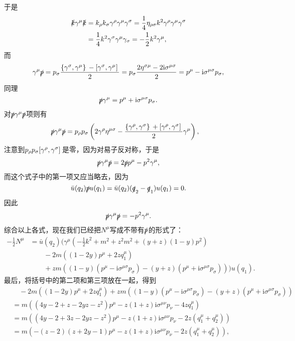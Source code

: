 \documentclass[hyperref, UTF8, a4paper]{ctexart}
\newcommand*{\ii}{\mathrm{i}}
\begin{document}
于是
\[
    \begin{aligned}
        \slashed{k} \gamma^\mu \slashed{k} &= k_\rho k_\sigma \gamma^\rho \gamma^\mu \gamma^\sigma = \frac{1}{4} \eta_{\rho \sigma} k^2 \gamma^\rho \gamma^\mu \gamma^\sigma \\
        &= \frac{1}{4} k^2 \gamma^\sigma \gamma^\mu \gamma_\sigma = - \frac{1}{2} k^2 \gamma^\mu,
    \end{aligned}
\]
而
\[
    \gamma^\mu \slashed{p} = p_\sigma \frac{\acomm*{\gamma^\sigma}{\gamma^\mu} - \comm*{\gamma^\sigma}{\gamma^\mu}}{2} = p_\sigma \frac{2 \eta^{\sigma \mu} - 2 \ii \sigma^{\mu \sigma}}{2} = p^\mu - \ii \sigma^{\mu \sigma} p_\sigma,
\]
同理
\[
    \slashed{p} \gamma^\mu = p^\mu + \ii \sigma^{\mu \sigma} p_\sigma.
\]
对$\slashed{p} \gamma^\mu \slashed{p}$项则有
\[
    \begin{aligned}
        \slashed{p} \gamma^\mu \slashed{p} &= p_\rho p_\sigma \left( 2 \gamma^\rho \eta^{\mu \sigma} - \frac{\acomm*{\gamma^\rho}{\gamma^\sigma} + \comm*{\gamma^\rho}{\gamma^\sigma}}{2} \gamma^\mu \right),
    \end{aligned}
\]
注意到$p_\rho p_\sigma \comm*{\gamma^\rho}{\gamma^\sigma}$是零，因为对易子反对称，于是
\[
    \slashed{p} \gamma^\mu \slashed{p} = 2 \slashed{p} p^\mu - p^2 \gamma^\mu,
\]
而这个式子中的第一项又应当略去，因为
\[
    \bar{u}(q_2) \slashed{p} u(q_1) = \bar{u}(q_2) (\slashed{q}_2 - \slashed{q}_1) u(q_1) = 0.
\]
因此
\[
    \slashed{p} \gamma^\mu \slashed{p} = - p^2 \gamma^\mu.
\]
综合以上各式，现在我们已经把$N^\mu$写成不带有$\slashed{p}$的形式了：
\begin{equation}
    \begin{aligned}
        - \frac{1}{2} N^\mu &= \bar{u}(q_2) (
            \gamma^\mu (- \frac{1}{2} k^2 + m^2 + z^2 m^2 + (y+z)(1-y) p^2) \\
            &\quad \quad - 2m ((1-2y) p^\mu + 2z q_1^\mu) \\
            &\quad \quad + zm((1-y) (p^\mu - \ii \sigma^{\mu \sigma} p_\sigma) - (y+z) (p^\mu + \ii \sigma^{\mu \sigma} p_\sigma))
        ) u(q_1).
    \end{aligned}
    \label{eq:no-slashed-p-n-mu}
\end{equation}
最后，将括号中的第二项和第三项放在一起，得到
\[
    \begin{aligned}
        &\quad - 2m ((1-2y) p^\mu + 2z q_1^\mu) + zm((1-y) (p^\mu - \ii \sigma^{\mu \sigma} p_\sigma) - (y+z) (p^\mu + \ii \sigma^{\mu \sigma} p_\sigma)) \\
        &= m((4y - 2 + z - 2yz - z^2) p^\mu - z(1+z) \ii \sigma^{\mu \nu} p_\nu - 4z q_1^\mu) \\
        &= m((4y - 2 + 3z - 2yz - z^2) p^\mu - z(1+z) \ii \sigma^{\mu \nu} p_\nu - 2z (q_1^\mu + q_2^\mu)) \\
        &= m(- (z-2)(z+2y-1) p^\mu - z(1+z) \ii \sigma^{\mu \nu} p_\nu - 2z (q_1^\mu + q_2^\mu)) ,
    \end{aligned}
\]
\end{document}
